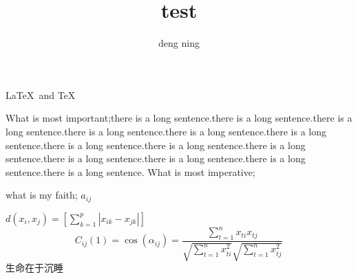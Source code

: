 \documentclass{ctexart}
\author{deng ning}
\title{test}
\begin{document}
\maketitle
\LaTeX  \ and \TeX

What is most important;there is a long sentence.there is a long sentence.there is a long sentence.there is a long sentence.there is a long sentence.there is a long sentence.there is a long sentence.there is a long sentence.there is a long sentence.there is a long sentence.there is a long sentence.there is a long sentence.there is a long sentence.
What is most imperative;

what is my faith;
$a_{ij}$

$d(x_i,x_j)=[\sum_{k=1}^p|x_{ik}-x_{jk}|] $
\[
    C_{ij}(1)=\cos(\alpha_{ij})=\frac{\sum_{t=1}^n x_{ti}x_{tj}}{\sqrt{\sum_{t=1}^n x^2_{ti}} \sqrt{\sum_{t=1}^n x^2_{tj}}}
\]
\kaishu 生命\heiti 在于沉睡
\end{document}
